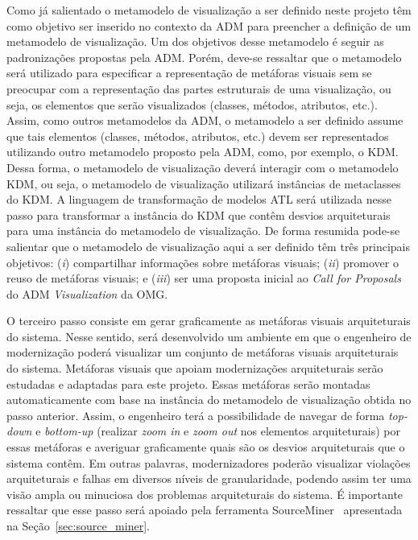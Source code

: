 \documentclass[12pt]{article}
\begin{document}
Como já salientado o metamodelo de visualização a ser definido neste projeto têm como objetivo ser inserido no contexto da ADM para preencher a definição de um metamodelo de visualização. Um dos objetivos desse metamodelo é seguir as padronizações propostas pela ADM. Porém, deve-se ressaltar que o metamodelo será utilizado para especificar a representação de metáforas visuais sem se preocupar com a representação das partes estruturais de uma visualização, ou seja, os elementos que serão visualizados (classes, métodos, atributos, etc.). Assim, como outros metamodelos da ADM, o metamodelo a ser definido assume que tais elementos (classes, métodos, atributos, etc.) devem ser representados utilizando outro metamodelo proposto pela ADM, como, por exemplo, o KDM. Dessa forma, o metamodelo de visualização deverá interagir com o metamodelo KDM, ou seja, o metamodelo de visualização utilizará instâncias de metaclasses do KDM. A linguagem de transformação de modelos ATL será utilizada nesse passo para transformar a instância do KDM que contêm desvios arquiteturais para uma instância do metamodelo de visualização.  De forma resumida pode-se salientar que o metamodelo de visualização aqui a ser definido têm três principais objetivos: (\textit{i}) compartilhar informações sobre metáforas visuais; (\textit{ii}) promover o reuso de metáforas visuais; e (\textit{iii}) ser uma proposta inicial ao \textit{Call for Proposals} do ADM \textit{Visualization} da OMG. 

O terceiro passo consiste em gerar graficamente as metáforas visuais arquiteturais do sistema. Nesse sentido, será desenvolvido um ambiente em que o engenheiro de modernização poderá visualizar um conjunto de metáforas visuais arquiteturais do sistema. Metáforas visuais que apoiam modernizações arquiteturais serão estudadas e adaptadas para este projeto. Essas metáforas serão montadas automaticamente com base na instância do metamodelo de visualização obtida no passo anterior. Assim, o engenheiro terá a possibilidade de navegar de forma \textit{top-down} e \textit{bottom-up} (realizar \textit{zoom in} e \textit{zoom out} nos elementos arquiteturais) por essas metáforas e averiguar graficamente quais são os desvios arquiteturais que o sistema contêm. Em outras palavras, modernizadores poderão visualizar violações arquiteturais e falhas em diversos níveis de granularidade, podendo assim ter uma visão ampla ou minuciosa dos problemas arquiteturais do sistema. É importante ressaltar que esse passo será apoiado pela ferramenta SourceMiner~\cite{source_miner_glauco} apresentada na Seção~\ref{sec:source_miner}.
\end{document}

